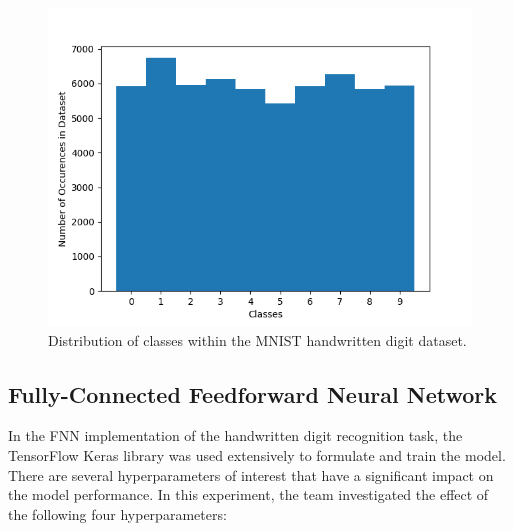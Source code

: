 \documentclass[a4paper]{article}
\begin{document}
\begin{figure}[h!]
    \centering
    \includegraphics[scale=0.5]{images/mnist-class-dist.png}
    \caption{Distribution of classes within the MNIST handwritten digit dataset.}
    \label{fig:mnist-class-dist}
\end{figure}

\subsection{Fully-Connected Feedforward Neural Network}
In the FNN implementation of the handwritten digit recognition task, the TensorFlow Keras library was used extensively to formulate and train the model. There are several hyperparameters of interest that have a significant impact on the model performance. In this experiment, the team investigated the effect of the following four hyperparameters:
\end{document}
